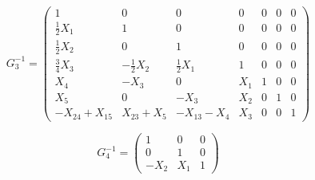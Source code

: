 \documentclass[reqno,12pt]{amsart}
\theoremstyle{plain}
\theoremstyle{definition}
\begin{document}
$$
G^{-1}_3=\left(\begin{array}{c|cc|c|cc|c}
1&           0&       0&        0& 0&0&0\\\hline
\tfrac12X_1&      1&       0&        0& 0&0&0\\
\tfrac12X_2&      0&       1&        0& 0&0&0\\\hline
\tfrac34X_3&      -\tfrac12X_2& \tfrac12X_1&   1& 0&0&0\\\hline
X_4&          -X_3&     0&        X_1&1&0&0\\
X_5&          0&       -X_3&      X_2&0&1&0\\\hline
-X_{24}+X_{15}&X_{23}+X_5&-X_{13}-X_4&X_3&0&0&1 
\end{array}\right)
$$

$$
G^{-1}_4=\left(\begin{array}{cc|c}
1&  0& 0\\
0&  1& 0\\\hline
-X_2&X_1&1 
\end{array}\right)
$$






%
%

  
\end{document}
